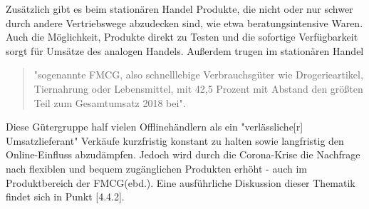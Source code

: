 \begin{folding}
Zusätzlich gibt es beim stationären Handel Produkte, die nicht oder nur schwer durch andere Vertriebswege abzudecken sind, wie etwa beratungsintensive Waren. Auch die Möglichkeit, Produkte direkt zu Testen und die sofortige Verfügbarkeit sorgt für Umsätze des analogen Handels\cite[S. 2]{Maier}. Außerdem trugen im stationären Handel
\begin{quote}
 "sogenannte \ac{FMCG}, also schnelllebige Verbrauchsgüter wie   Drogerieartikel,   Tiernahrung   oder   Lebensmittel,   mit 42,5 Prozent mit Abstand den größten Teil zum Gesamtumsatz 2018 bei"\cite{corona-schub}.
\end{quote}
Diese Gütergruppe half vielen Offlinehändlern als ein "verlässliche[r] Umsatzlieferant" Verkäufe kurzfristig konstant zu halten sowie langfristig den Online-Einfluss abzudämpfen. Jedoch wird durch die Corona-Krise die Nachfrage nach flexiblen und bequem zugänglichen Produkten erhöht - auch im Produktbereich der \ac{FMCG}(ebd.). Eine ausführliche Diskussion dieser Thematik findet sich in Punkt [4.4.2].







\end{folding}

